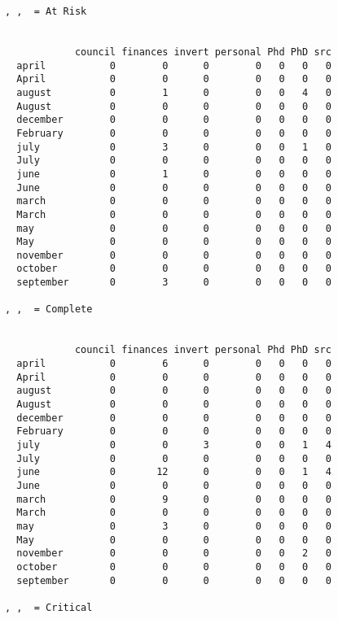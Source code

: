 \begin{verbatim}
, ,  = At Risk

           
            council finances invert personal Phd PhD src
  april           0        0      0        0   0   0   0
  April           0        0      0        0   0   0   0
  august          0        1      0        0   0   4   0
  August          0        0      0        0   0   0   0
  december        0        0      0        0   0   0   0
  February        0        0      0        0   0   0   0
  july            0        3      0        0   0   1   0
  July            0        0      0        0   0   0   0
  june            0        1      0        0   0   0   0
  June            0        0      0        0   0   0   0
  march           0        0      0        0   0   0   0
  March           0        0      0        0   0   0   0
  may             0        0      0        0   0   0   0
  May             0        0      0        0   0   0   0
  november        0        0      0        0   0   0   0
  october         0        0      0        0   0   0   0
  september       0        3      0        0   0   0   0

, ,  = Complete

           
            council finances invert personal Phd PhD src
  april           0        6      0        0   0   0   0
  April           0        0      0        0   0   0   0
  august          0        0      0        0   0   0   0
  August          0        0      0        0   0   0   0
  december        0        0      0        0   0   0   0
  February        0        0      0        0   0   0   0
  july            0        0      3        0   0   1   4
  July            0        0      0        0   0   0   0
  june            0       12      0        0   0   1   4
  June            0        0      0        0   0   0   0
  march           0        9      0        0   0   0   0
  March           0        0      0        0   0   0   0
  may             0        3      0        0   0   0   0
  May             0        0      0        0   0   0   0
  november        0        0      0        0   0   2   0
  october         0        0      0        0   0   0   0
  september       0        0      0        0   0   0   0

, ,  = Critical


\end{verbatim}
